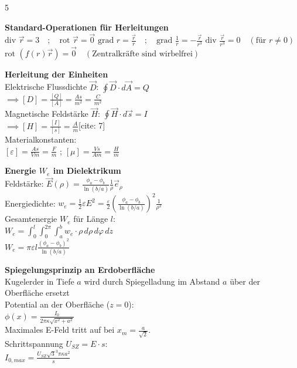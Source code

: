 \documentclass[a4paper, 2pt, landscape]{extarticle}
\begin{document}
\begin{multicols*}{5}
\begin{tcolorbox}[title={Vektoranalysis: Wichtige Identitäten (Blatt 1)}, colback=white, colframe=black]
\textbf{Standard-Operationen für Herleitungen} \\
$\text{div } \vec{r} = 3 \quad ; \quad \text{rot } \vec{r} = \vec{0}$
$\text{grad } r = \frac{\vec{r}}{r} \quad ; \quad \text{grad } \frac{1}{r} = -\frac{\vec{r}}{r^3}$
$\text{div } \frac{\vec{r}}{r^3} = 0 \quad (\text{für } r \neq 0)$
$\text{rot } (f(r)\vec{r}) = \vec{0} \quad (\text{Zentralkräfte sind wirbelfrei})$
\end{tcolorbox}

\begin{tcolorbox}[title={Grundlagen: Einheitencheck (Blatt 1)}, colback=white, colframe=black]
\textbf{Herleitung der Einheiten} \\
Elektrische Flussdichte $\vec{D}$: $\oint \vec{D} \cdot d\vec{A} = Q$ \\
$\implies [D] = \frac{[Q]}{[A]} = \frac{As}{m^2} = \frac{C}{m^2}$ \\
Magnetische Feldstärke $\vec{H}$: $\oint \vec{H} \cdot d\vec{s} = I$ \\
$\implies [H] = \frac{[I]}{[s]} = \frac{A}{m}$[cite: 7] \\
Materialkonstanten: \\
$[\varepsilon] = \frac{As}{Vm} = \frac{F}{m}$ ; $[\mu] = \frac{Vs}{Am} = \frac{H}{m}$
\end{tcolorbox}

\begin{tcolorbox}[title={Elektrostatik: Koaxialkabel Energie (Blatt 4)}, colback=white, colframe=black]
\textbf{Energie $W_e$ im Dielektrikum} \\
Feldstärke: $\vec{E}(\rho) = \frac{\phi_a - \phi_b}{\ln(b/a)} \frac{1}{\rho} \vec{e}_\rho$\\
Energiedichte: $w_e = \frac{1}{2} \varepsilon E^2 = \frac{\varepsilon}{2} \left( \frac{\phi_a - \phi_b}{\ln(b/a)} \right)^2 \frac{1}{\rho^2}$ \\
Gesamtenergie $W_e$ für Länge $l$: \\
$W_e = \int_0^l \int_0^{2\pi} \int_a^b w_e \cdot \rho \, d\rho \, d\varphi \, dz$ \\
$W_e = \pi \varepsilon l \frac{(\phi_a - \phi_b)^2}{\ln(b/a)}$
\end{tcolorbox}

\begin{tcolorbox}[title={Strömungsfeld: Kugelerder II (Blatt 5)}, colback=white, colframe=black]
\textbf{Spiegelungsprinzip an Erdoberfläche} \\
Kugelerder in Tiefe $a$ wird durch Spiegelladung im Abstand $a$ über der Oberfläche ersetzt\\
Potential an der Oberfläche ($z=0$): \\
$\phi(x) = \frac{I_0}{2\pi \kappa \sqrt{x^2 + a^2}}$ \\
Maximales E-Feld tritt auf bei $x_m = \frac{a}{\sqrt{2}}$. \\
Schrittspannung $U_{SZ} = E \cdot s$: \\
$I_{0,max} = \frac{U_{SZ} \sqrt{3}^3 \pi \kappa a^2}{s}$
\end{tcolorbox}


\end{multicols*}
\end{document}
